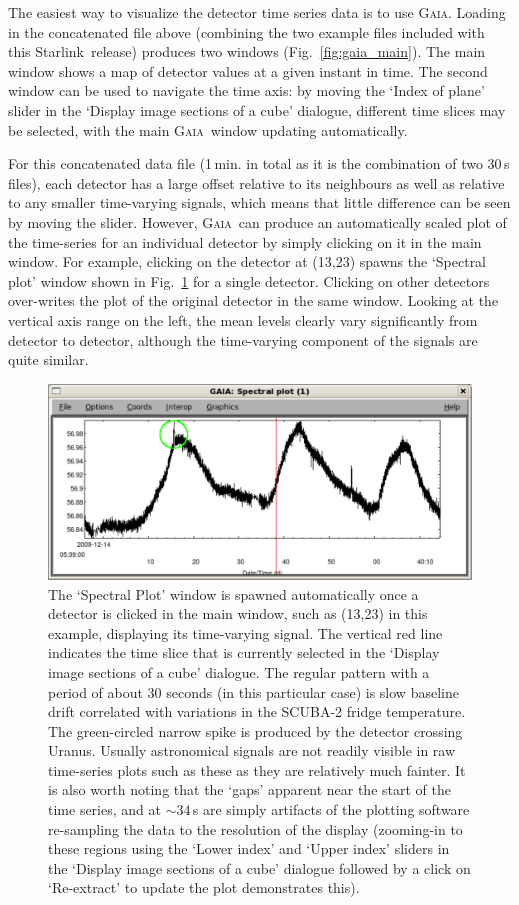 \documentclass[twoside,11pt]{article}
\newcommand{\htmladdnormallink}[2]{#1}
\newcommand{\xref}[3]{#1}
\renewcommand{\_}{\texttt{\symbol{95}}}
\newcommand{\starlink}{\htmladdnormallink{Starlink}{http://starlink.jach.hawaii.edu}}
\newcommand{\gaia}{\xref{\textsc{Gaia}}{sun214}{}}
\begin{document}
The easiest way to visualize the detector time series data is to use
\gaia. Loading in the concatenated file above (combining the two
example files included with this \starlink\ release) produces two
windows (Fig.~\ref{fig:gaia_main}). The main window shows a map of
detector values at a given instant in time. The second window can be
used to navigate the time axis: by moving the `Index of plane' slider
in the `Display image sections of a cube' dialogue, different time
slices may be selected, with the main \gaia\ window updating
automatically.

For this concatenated data file (1\,min. in total as it is the
combination of two 30\,s files), each detector has a large offset
relative to its neighbours as well as relative to any smaller
time-varying signals, which means that little difference can be seen
by moving the slider. However, \gaia\ can produce an automatically
scaled plot of the time-series for an individual detector by simply
clicking on it in the main window. For example, clicking on the
detector at (13,23) spawns the `Spectral plot' window shown in
Fig.~\ref{fig:gaia_spec} for a single detector. Clicking on other
detectors over-writes the plot of the original detector in the same
window. Looking at the vertical axis range on the left, the mean
levels clearly vary significantly from detector to detector, although
the time-varying component of the signals are quite similar.

\begin{figure}
\begin{center}
\includegraphics[width=0.7\linewidth]{sc19_gaia_spec}
\caption{The `Spectral Plot' window is spawned automatically once a
  detector is clicked in the main window, such as (13,23) in this
  example, displaying its time-varying signal. The vertical red line
  indicates the time slice that is currently selected in the `Display
  image sections of a cube' dialogue. The regular pattern with a
  period of about 30 seconds (in this particular case) is slow
  baseline drift correlated with variations in the SCUBA-2 fridge
  temperature. The green-circled narrow spike is produced by the
  detector crossing Uranus. Usually astronomical signals are not
  readily visible in raw time-series plots such as these as they are
  relatively much fainter. It is also worth noting that the `gaps'
  apparent near the start of the time series, and at $\sim34$\,s are
  simply artifacts of the plotting software re-sampling the data to
  the resolution of the display (zooming-in to these regions using the
  `Lower index' and `Upper index' sliders in the `Display image
  sections of a cube' dialogue followed by a click on `Re-extract' to
  update the plot demonstrates this).  }
\label{fig:gaia_spec}
\end{center}
\end{figure}
\end{document}
